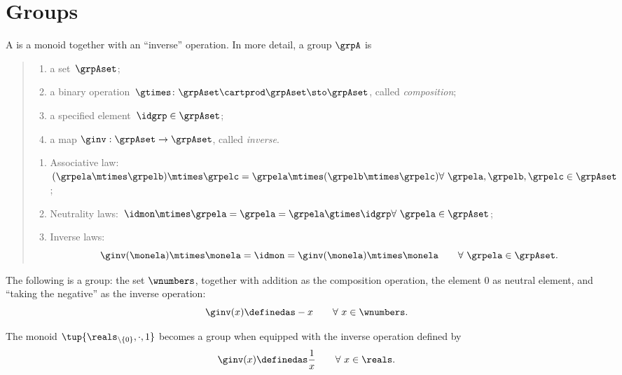 \section{Groups}
\label{sec:groups}
\begin{ctdefinition}[Group]
  \label{def:group}
  A \emph{} is a monoid together with an ``inverse'' operation.
  In more detail, a group $\grpA$ is
  \begin{quote}
    \constit
    \begin{enumerate}
      \item a set~$\grpAset$;
      \item a binary operation~$\gtimes \colon \grpAset \cartprod \grpAset \sto \grpAset$, called \emph{composition};
      \item a specified element~$\idgrp \in \grpAset$;
      \item a map $\ginv: \grpAset \to \grpAset$, called \emph{inverse}.
    \end{enumerate}
    \condit
    \begin{enumerate}
      \item Associative law:~$(\grpela\mtimes \grpelb)\mtimes \grpelc=\grpela\mtimes (\grpelb\mtimes \grpelc) \hfill \forall \  \grpela, \grpelb, \grpelc \in \grpAset$;
      \item Neutrality laws:~$\idmon\mtimes \grpela=\grpela=\grpela \gtimes \idgrp \hfill \forall \  \grpela \in \grpAset$;
      \item Inverse laws:
      \begin{equation}
        \label{eq:group-inverse-law}
        \ginv(\monela) \mtimes \monela = \idmon = \ginv(\monela) \mtimes \monela \quad \quad \forall \  \grpela  \in \grpAset.
      \end{equation}
    \end{enumerate}
  \end{quote}
\end{ctdefinition}
\begin{example}
  The following is a group: the set $\wnumbers$, together with addition as the composition operation, the element $0$ as neutral element, and ``taking the negative'' as the inverse operation:
  \begin{equation}
    \ginv(x) \definedas -x \quad \quad \forall \ x \in \wnumbers.
  \end{equation}
\end{example}
\begin{example}
  The monoid $\tup{\reals_{\backslash \{ 0 \}}, \cdot, 1}$ becomes a group when equipped with the inverse operation defined by
  \begin{equation}
    \ginv(x) \definedas \frac{1}{x} \quad \quad \forall \ x \in \reals.
  \end{equation}
\end{example}
